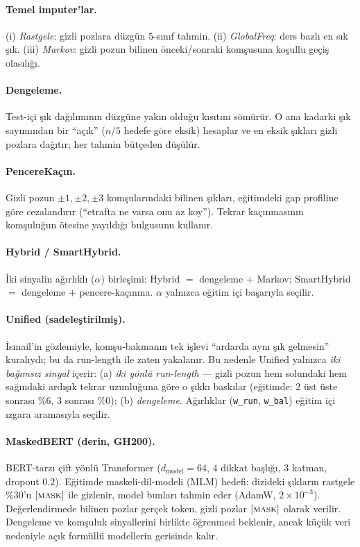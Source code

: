 \documentclass[11pt]{article}
\begin{document}
\paragraph{Temel imputer'lar.} (i) \emph{Rastgele}: gizli pozlara düzgün
$5$-sınıf tahmin. (ii) \emph{GlobalFreq}: ders bazlı en sık şık. (iii)
\emph{Markov}: gizli pozun bilinen önceki/sonraki komşusuna koşullu geçiş
olasılığı.

\paragraph{Dengeleme.} Test-içi şık dağılımının düzgüne yakın olduğu kısıtını
sömürür. O ana kadarki şık sayımından bir ``açık'' ($n/5$ hedefe göre eksik)
hesaplar ve en eksik şıkları gizli pozlara dağıtır; her tahmin bütçeden
düşülür.

\paragraph{PencereKaçın.} Gizli pozun $\pm 1, \pm 2, \pm 3$ komşularındaki
bilinen şıkları, eğitimdeki gap profiline göre cezalandırır (``etrafta ne
varsa onu az koy''). Tekrar kaçınmasının komşuluğun ötesine yayıldığı bulgusunu
kullanır.

\paragraph{Hybrid / SmartHybrid.} İki sinyalin ağırlıklı ($\alpha$)
birleşimi: Hybrid $=$ dengeleme $+$ Markov; SmartHybrid $=$ dengeleme $+$
pencere-kaçınma. $\alpha$ yalnızca eğitim içi başarıyla seçilir.

\paragraph{Unified (sadeleştirilmiş).} İsmail'in gözlemiyle, komşu-bakmanın
tek işlevi ``ardarda aynı şık gelmesin'' kuralıydı; bu da run-length ile
zaten yakalanır. Bu nedenle Unified yalnızca \emph{iki bağımsız sinyal}
içerir: (a) \emph{iki yönlü run-length} --- gizli pozun hem solundaki hem
sağındaki ardışık tekrar uzunluğuna göre o şıkkı baskılar (eğitimde:
$2$ üst üste sonrası $\%6$, $3$ sonrası $\%0$); (b) \emph{dengeleme}.
Ağırlıklar (\texttt{w\_run}, \texttt{w\_bal}) eğitim içi ızgara aramasıyla
seçilir.

\paragraph{MaskedBERT (derin, GH200).} BERT-tarzı çift yönlü Transformer
($d_{\text{model}}=64$, $4$ dikkat başlığı, $3$ katman, dropout $0.2$).
Eğitimde maskeli-dil-modeli (MLM) hedefi: dizideki şıkların rastgele $\%30$'u
$[\textsc{mask}]$ ile gizlenir, model bunları tahmin eder (AdamW,
$2\times10^{-3}$). Değerlendirmede bilinen pozlar gerçek token, gizli pozlar
$[\textsc{mask}]$ olarak verilir. Dengeleme ve komşuluk sinyallerini birlikte
öğrenmesi beklenir, ancak küçük veri nedeniyle açık formüllü modellerin
gerisinde kalır.
\end{document}

